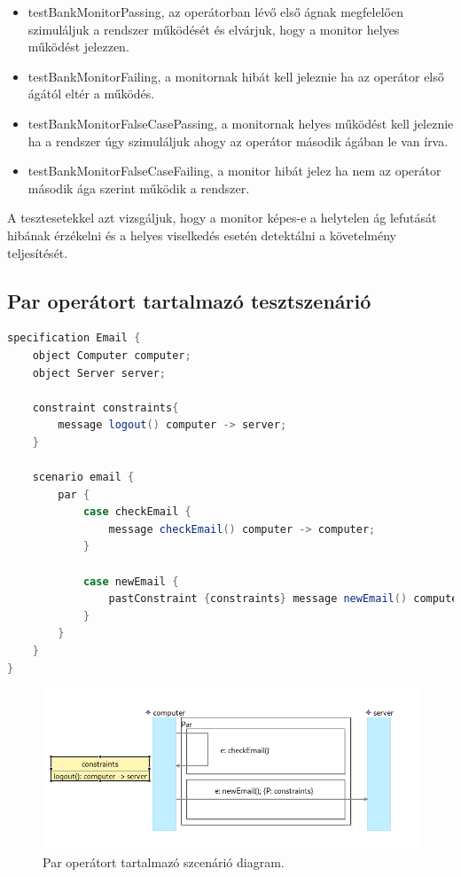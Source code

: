 \begin{itemize}
    \item testBankMonitorPassing, az operátorban lévő első ágnak megfelelően szimuláljuk a rendszer működését és elvárjuk, hogy a monitor helyes működést jelezzen.
    \item testBankMonitorFailing, a monitornak hibát kell jeleznie ha az operátor első ágától eltér a működés.
    \item testBankMonitorFalseCasePassing, a monitornak helyes működést kell jeleznie ha a rendszer úgy szimuláljuk ahogy az operátor második ágában le van írva.
    \item testBankMonitorFalseCaseFailing, a monitor hibát jelez ha nem az operátor második ága szerint működik a rendszer.
\end{itemize}

A tesztesetekkel azt vizsgáljuk, hogy a monitor képes-e a helytelen ág lefutását hibának érzékelni és a helyes viselkedés esetén detektálni a követelmény teljesítését.

\subsection{Par operátort tartalmazó tesztszenárió}

\begin{lstlisting}[language=java, frame=single, float=ht!, caption={Par operátort tartalmazó tesztszcenárió.},captionpos=b]
specification Email {
    object Computer computer;
    object Server server;

    constraint constraints{
        message logout() computer -> server;
    }

    scenario email {
        par {
            case checkEmail {
                message checkEmail() computer -> computer;
            }

            case newEmail {
                pastConstraint {constraints} message newEmail() computer -> server;
            }
        }
    }
}
\end{lstlisting}

\begin{figure}[!ht]
    \centering
    \includegraphics[width=150mm, keepaspectratio]{figures/diagramParExample.png}
    \caption{Par operátort tartalmazó szcenárió diagram.}
\end{figure}

